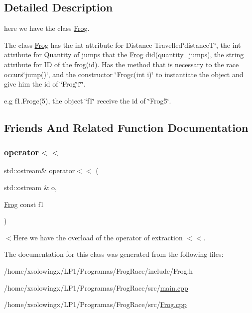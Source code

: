 \subsection{Detailed Description}
here we have the class \hyperlink{classFrog}{Frog}. 

The class \hyperlink{classFrog}{Frog} has the int attribute for Distance Travelled\char`\"{}distance\+T\char`\"{}, the int attribute for Quantity of jumps that the \hyperlink{classFrog}{Frog} did(quantity\+\_\+jumps), the string attribute for ID of the frog(id). Has the method that is necessary to the race occurs\char`\"{}jump()\char`\"{}, and the constructor \char`\"{}\+Frogc(int i)\char`\"{} to instantiate the object and give him the id of \char`\"{}\+Frog\char`\"{}i\char`\"{}\char`\"{}.

e.\+g f1.\+Frogc(5), the object \char`\"{}f1\char`\"{} receive the id of \char`\"{}\+Frog5\char`\"{}. 

\subsection{Friends And Related Function Documentation}
\mbox{\label{classFrog_a63caf8bfed035c0ecc5f3954119f34c2}} 
\subsubsection{\texorpdfstring{operator$<$$<$}{operator<<}}
{\footnotesize\ttfamily std\+::ostream\& operator$<$$<$ (\begin{DoxyParamCaption}\item[{std\+::ostream \&}]{o,  }\item[{\hyperlink{classFrog}{Frog} const}]{f1 }\end{DoxyParamCaption})\hspace{0.3cm}{\ttfamily [friend]}}

$<$Here we have the overload of the operator of extraction $<$$<$. 

The documentation for this class was generated from the following files\+:\begin{DoxyCompactItemize}
\item 
/home/xsolowingx/\+L\+P1/\+Programas/\+Frog\+Race/include/Frog.\+h\item 
/home/xsolowingx/\+L\+P1/\+Programas/\+Frog\+Race/src/\hyperlink{main_8cpp}{main.\+cpp}\item 
/home/xsolowingx/\+L\+P1/\+Programas/\+Frog\+Race/src/\hyperlink{Frog_8cpp}{Frog.\+cpp}\end{DoxyCompactItemize}
